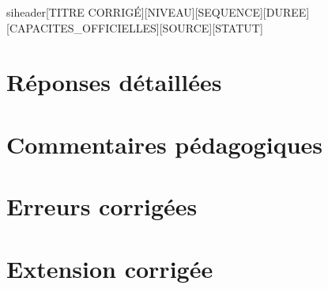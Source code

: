 \documentclass[a4paper,11pt]{article}
\begin{document}
siheader{[TITRE CORRIGÉ]}{[NIVEAU]}{[SEQUENCE]}{[DUREE]}{[CAPACITES\_OFFICIELLES]}{[SOURCE]}{[STATUT]}
\section*{Réponses détaillées}
\section*{Commentaires pédagogiques}
\section*{Erreurs corrigées}
\section*{Extension corrigée}
\end{document}
